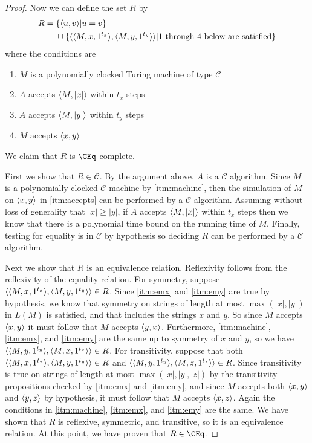 \begin{proof}
  Now we can define the set $R$ by
  \begin{align*}
    R = {} & \{\langle u,v\rangle|u=v\} \\
    & \cup \{\langle\langle M,x,1^{t_x}\rangle,\langle M,y,1^{t_y}\rangle\rangle |
    \text{1 through 4 below are satisfied}\}
  \end{align*}
  where the conditions are
  \begin{enumerate}
  \item\label{itm:machine} $M$ is a polynomially clocked Turing machine of type $\mathcal{C}$
  \item\label{itm:emx} $A$ accepts $\langle M,|x|\rangle$ within $t_x$ steps
  \item\label{itm:emy} $A$ accepts $\langle M,|y|\rangle$ within $t_y$ steps
  \item\label{itm:accepts} $M$ accepts $\langle x,y\rangle$
  \end{enumerate}
  We claim that $R$ is $\CEq$-complete.

  First we show that $R\in\mathcal{C}$.
  By the argument above, $A$ is a $\mathcal{C}$ algorithm.
  Since $M$ is a polynomially clocked $\mathcal{C}$ machine by \autoref{itm:machine}, then the simulation of $M$ on $\langle x,y\rangle$ in \autoref{itm:accepts} can be performed by a $\mathcal{C}$ algorithm.
  Assuming without loss of generality that $|x|\geq |y|$, if $A$ accepts $\langle M,|x|\rangle$ within $t_x$ steps then we know that there is a polynomial time bound on the running time of $M$.
  Finally, testing for equality is in $\mathcal{C}$ by hypothesis so deciding $R$ can be performed by a $\mathcal{C}$ algorithm.

  Next we show that $R$ is an equivalence relation.
  Reflexivity follows from the reflexivity of the equality relation.
  For symmetry, suppose $\langle\langle M,x,1^{t_x}\rangle,\langle M,y,1^{t_y}\rangle\rangle\in R$.
  Since \autoref{itm:emx} and \autoref{itm:emy} are true by hypothesis, we know that symmetry on strings of length at most $\max(|x|, |y|)$ in $L(M)$ is satisfied, and that includes the strings $x$ and $y$.
  So since $M$ accepts $\langle x,y\rangle$ it must follow that $M$ accepts $\langle y,x\rangle$.
  Furthermore, \autoref{itm:machine}, \autoref{itm:emx}, and \autoref{itm:emy} are the same up to symmetry of $x$ and $y$, so we have $\langle\langle M,y,1^{t_y}\rangle,\langle M,x,1^{t_x}\rangle\rangle\in R$.
  For transitivity, suppose that both $\langle\langle M,x,1^{t_x}\rangle,\langle M,y,1^{t_y}\rangle\rangle\in R$ and $\langle\langle M,y,1^{t_y}\rangle,\langle M,z,1^{t_z}\rangle\rangle\in R$.
  Since transitivity is true on strings of length at most $\max(|x|, |y|, |z|)$ by the transitivity propositions checked by \autoref{itm:emx} and \autoref{itm:emy}, and since $M$ accepts both $\langle x,y\rangle$ and $\langle y,z\rangle$ by hypothesis, it must follow that $M$ accepts $\langle x,z\rangle$.
  Again the conditions in \autoref{itm:machine}, \autoref{itm:emx}, and \autoref{itm:emy} are the same.
  We have shown that $R$ is reflexive, symmetric, and transitive, so it is an equivalence relation.
  At this point, we have proven that $R\in\CEq$.


\end{proof}
